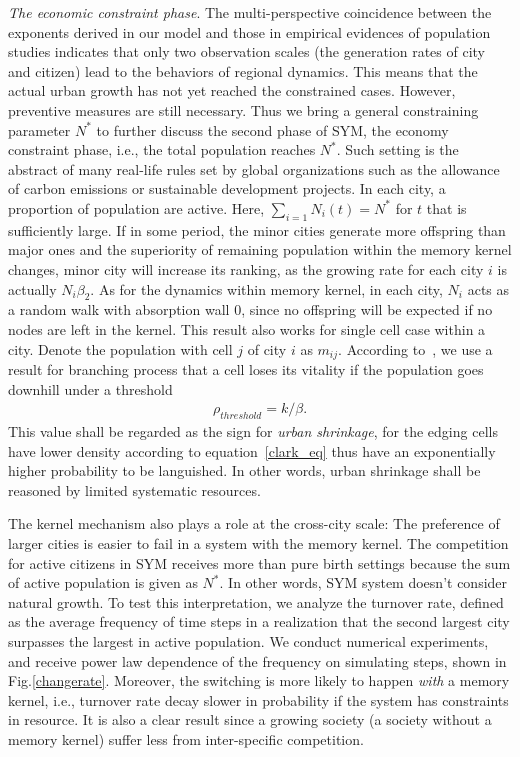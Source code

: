 \documentclass[reprint,unsortedaddress,amsmath,amssymb,aps,prl,showkeys]{revtex4-2}
\begin{document}
\textit{The economic constraint phase}. The multi-perspective coincidence between the exponents derived in our model and those in empirical evidences of population studies indicates that only two observation scales (the generation rates of city and citizen) lead to the behaviors of regional dynamics. This means that the actual urban growth has not yet reached the constrained cases. However, preventive measures are still necessary. Thus we bring a general constraining parameter $N^*$ to further discuss the second phase of SYM, the economy constraint phase, i.e., the total population reaches $N^*$. Such setting is the abstract of many real-life rules set by global organizations such as the allowance of carbon emissions or sustainable development projects. In each city, a proportion of population are active. Here, $\sum_{i=1} N_i(t) = N^*$ for $t$ that is sufficiently large. If in some period, the minor cities generate more offspring than major ones and the superiority of remaining population within the memory kernel changes, minor city will increase its ranking, as the growing rate for each city $i$ is actually $N_i\beta_2$. As for the dynamics within memory kernel, in each city, $N_i$ acts as a random walk with absorption wall $0$, since no offspring will be expected if no nodes are left in the kernel. This result also works for single cell case within a city. Denote the population with cell $j$ of city $i$ as $m_{ij}$. According to~\cite{durrett1999essentials}, we use a result for branching process that a cell loses its vitality if the population goes downhill under a threshold \begin{align}\rho_{threshold} = k/\beta.\end{align} This value shall be regarded as the sign for \emph{urban shrinkage}, for the edging cells have lower density according to equation~\ref{clark_eq} thus have an exponentially higher probability to be languished. In other words, urban shrinkage shall be reasoned by limited systematic resources. 

The kernel mechanism also plays a role at the cross-city scale: The preference of larger cities is easier to fail in a system with the memory kernel. The competition for active citizens in SYM receives more than pure birth settings because the sum of active population is given as $N^*$. In other words, SYM system doesn't consider natural growth. To test this interpretation, we analyze the turnover rate, defined as the average frequency of time steps in a realization that the second largest city surpasses the largest in active population. We conduct numerical experiments, and receive power law dependence of the frequency on simulating steps, shown in Fig.\@\ref{changerate}. Moreover, the switching is more likely to happen \textit{with} a memory kernel, i.e., turnover rate decay slower in probability if the system has constraints in resource. It is also a clear result since a growing society (a society without a memory kernel) suffer less from inter-specific competition.
\end{document}

